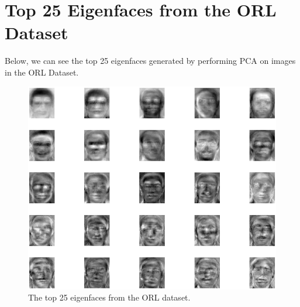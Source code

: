 \documentclass[a4paper]{article}
\begin{document}
\newpage
\section{Top 25 Eigenfaces from the ORL Dataset}

Below, we can see the top 25 eigenfaces generated by performing PCA on images in the ORL Dataset.
\begin{figure}[H]
	\centering
	\includegraphics[scale=1]{eigenfaces.png}
	\caption{The top 25 eigenfaces from the ORL dataset.}
\end{figure}
\end{document}
